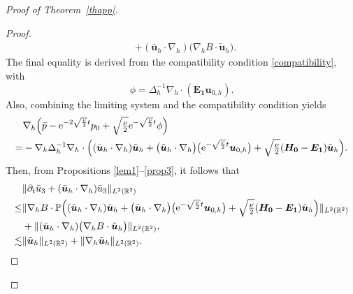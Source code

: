 \documentclass[pdflatex,sn-mathphys-num]{sn-jnl}%
\theoremstyle{thmstyleone}%
\theoremstyle{thmstyletwo}%
\theoremstyle{thmstylethree}%
\theoremstyle{thmstyletwo}
\begin{document}
\begin{proof}[Proof of Theorem~{\upshape\ref{thapp}}]
\begin{proof}
\begin{align}
		&+(\bar{\boldsymbol{u}}_h\cdot\nabla_h)\big(\nabla_{ h}B\cdot\tilde{\boldsymbol{u}}_h\big).
	\end{align}
	The final equality is derived from the compatibility condition \eqref{compatibility},  with
	\begin{equation}
		\phi=\Delta^{-1}_h\nabla_{h}\cdot(\boldsymbol{E_1}\boldsymbol{u}_{0,h}).
	\end{equation}
 Also, combining the limiting system and the compatibility condition yields
	\begin{align}\label{n2}
		&\nabla_{ h}\Big(\bar{p}-\mathrm{e}^{-2\sqrt{\frac\nu2}t}p_0+\sqrt{\tfrac{\nu}{2}}\mathrm{e}^{-\sqrt{\frac\nu2}t}\phi\Big)\notag\\
		=&-\nabla_{ h} \Delta_h^{-1}\nabla_{ h}\cdot
		\Big(
		(\bar {\boldsymbol u}_h \cdot \nabla_h) \tilde{\boldsymbol{u}}_h+\big(\tilde{\boldsymbol{u}}_h\cdot  \nabla_h\big)\big(\mathrm{e}^{-\sqrt{\frac\nu2}t}{\boldsymbol{u}}_{0,h}\big)+\sqrt{\tfrac{\nu}{2}}
		(\boldsymbol{H_0}
		-\boldsymbol{E_1})\tilde{\boldsymbol{u}}_h
		\Big).
	\end{align}
	Then, from  Propositions \ref{lem1}--\ref{prop3}, it follows that
	\begin{align}\label{n3}
		&\lVert
		\partial_t \bar{u}_3+(\bar{\boldsymbol{u}}_h\cdot\nabla_h)\bar{u}_3\rVert_{{L}^{2}(\mathbb{R}^2)}\notag\\
		\leq&\lVert\nabla_{h}B\cdot
		\mathbb{P}\Big(	(\bar {\boldsymbol u}_h \cdot \nabla_h) \tilde{\boldsymbol{u}}_h+\big(\tilde{\boldsymbol{u}}_h\cdot  \nabla_h\big)\big(\mathrm{e}^{-\sqrt{\frac\nu2}t}{\boldsymbol{u}}_{0,h}\big)+\sqrt{\tfrac{\nu}{2}}
		(\boldsymbol{H_0}
		-\boldsymbol{E_1})\tilde{\boldsymbol{u}}_h
		\Big)\rVert_{{L}^{2}(\mathbb{R}^2)}\notag\\
		&+\lVert(\bar{\boldsymbol{u}}_h\cdot\nabla_h)\big(\nabla_{ h}B\cdot\tilde{\boldsymbol{u}}_h\big)\rVert_{{L}^{2}(\mathbb{R}^2)},\notag\\
		\lesssim&
		\lVert
		\tilde{\boldsymbol{u}}_h
		\rVert_{{L}^{2}(\mathbb{R}^2)}
		+
		\lVert\nabla_{ h}
		\tilde{\boldsymbol{u}}_h
		\rVert_{{L}^{2}(\mathbb{R}^2)}.
	\end{align}
	

\end{proof}
\end{proof}
\end{document}
